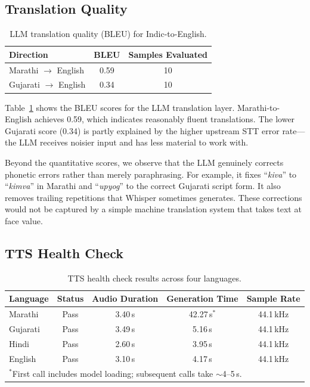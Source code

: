 \subsection{Translation Quality}

\begin{table}[t]
\centering
\caption{LLM translation quality (BLEU) for Indic-to-English.}
\label{tab:translation}
\begin{tabular}{lcc}
\toprule
\textbf{Direction} & \textbf{BLEU} & \textbf{Samples Evaluated} \\
\midrule
Marathi $\rightarrow$ English  & 0.59 & 10 \\
Gujarati $\rightarrow$ English & 0.34 & 10 \\
\bottomrule
\end{tabular}
\end{table}

Table~\ref{tab:translation} shows the BLEU scores for the LLM translation layer. Marathi-to-English achieves 0.59, which indicates reasonably fluent translations. The lower Gujarati score (0.34) is partly explained by the higher upstream STT error rate---the LLM receives noisier input and has less material to work with.

Beyond the quantitative scores, we observe that the LLM genuinely corrects phonetic errors rather than merely paraphrasing. For example, it fixes ``\textit{kiva}'' to ``\textit{kimva}'' in Marathi and ``\textit{upyog}'' to the correct Gujarati script form. It also removes trailing repetitions that Whisper sometimes generates. These corrections would not be captured by a simple machine translation system that takes text at face value.

\subsection{TTS Health Check}

\begin{table}[t]
\centering
\caption{TTS health check results across four languages.}
\label{tab:tts}
\begin{tabular}{lcccc}
\toprule
\textbf{Language} & \textbf{Status} & \textbf{Audio Duration} & \textbf{Generation Time} & \textbf{Sample Rate} \\
\midrule
Marathi  & Pass & 3.40\,s & 42.27\,s$^*$ & 44.1\,kHz \\
Gujarati & Pass & 3.49\,s & 5.16\,s      & 44.1\,kHz \\
Hindi    & Pass & 2.60\,s & 3.95\,s      & 44.1\,kHz \\
English  & Pass & 3.10\,s & 4.17\,s      & 44.1\,kHz \\
\bottomrule
\multicolumn{5}{l}{\footnotesize $^*$First call includes model loading; subsequent calls take $\sim$4--5\,s.}
\end{tabular}
\end{table}

